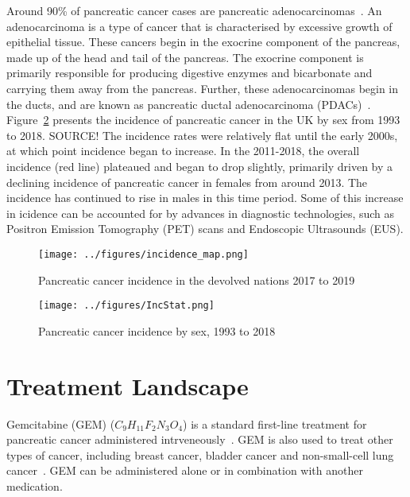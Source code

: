 Around 90\% of pancreatic cancer cases are pancreatic adenocarcinomas~\cite{pishvaian}. An adenocarcinoma is a type of cancer that is characterised by excessive growth of epithelial tissue. These cancers begin in the exocrine component of the pancreas, made up of the head and tail of the pancreas. The exocrine component is primarily responsible for producing digestive enzymes and bicarbonate and carrying them away from the pancreas. Further, these adenocarcinomas begin in the ducts, and are known as pancreatic ductal adenocarcinoma (PDACs)~\cite{neoptolemos}. \\

Figure~\ref{pancInc} presents the incidence of pancreatic cancer in the UK by sex from 1993 to 2018. SOURCE! The incidence rates were relatively flat until the early 2000s, at which point incidence began to increase. In the 2011-2018, the overall incidence (red line) plateaued and began to drop slightly, primarily driven by a declining incidence of pancreatic cancer in females from around 2013. The incidence has continued to rise in males in this time period. Some of this increase in icidence can be accounted for by advances in diagnostic technologies, such as Positron Emission Tomography (PET) scans and Endoscopic Ultrasounds (EUS). \\

\begin{figure}[h]
    \centering
    \texttt{[image: ../figures/incidence\_map.png]}
    \caption{Pancreatic cancer incidence in the devolved nations 2017 to 2019}
    \label{pancIncMap}
\end{figure}

\begin{figure}[h]
    \centering
    \texttt{[image: ../figures/IncStat.png]}
    \caption{Pancreatic cancer incidence by sex, 1993 to 2018}
    \label{pancInc}
\end{figure}

\section{Treatment Landscape}
Gemcitabine (GEM) ($C_9H_{11}F_2N_3O_4$) is a standard first-line treatment for pancreatic cancer administered intrveneously~\cite{TA25}. GEM is also used to treat other types of cancer, including breast cancer, bladder cancer and non-small-cell lung cancer~\cite{wong2009}. GEM can be administered alone or in combination with another medication. \\

